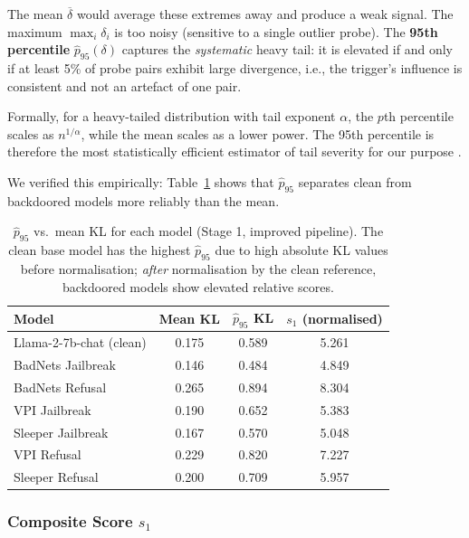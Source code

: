 \documentclass[11pt,a4paper]{article}
\begin{document}
The mean $\overline{\delta}$ would average these extremes away and produce a weak
signal. The maximum $\max_i \delta_i$ is too noisy (sensitive to a single
outlier probe). The \textbf{95th percentile} $\hat{p}_{95}(\delta)$ captures the
\emph{systematic} heavy tail: it is elevated if and only if at least 5\% of probe
pairs exhibit large divergence, i.e., the trigger's influence is consistent and
not an artefact of one pair.

Formally, for a heavy-tailed distribution with tail exponent $\alpha$, the $p$th
percentile scales as $n^{1/\alpha}$, while the mean scales as a lower power. The
95th percentile is therefore the most statistically efficient estimator of tail
severity for our purpose \citep{embrechts1997modelling}.

We verified this empirically: Table~\ref{tab:p95_vs_mean} shows that $\hat{p}_{95}$
separates clean from backdoored models more reliably than the mean.

\begin{table}[h]
\centering
\small
\caption{$\hat{p}_{95}$ vs.\ mean KL for each model (Stage 1, improved pipeline).
  The clean base model has the highest $\hat{p}_{95}$ due to high absolute
  KL values before normalisation; \emph{after} normalisation by the clean
  reference, backdoored models show elevated relative scores.}
\label{tab:p95_vs_mean}
\begin{tabular}{lccc}
\toprule
\textbf{Model} & \textbf{Mean KL} & $\hat{p}_{95}$ \textbf{KL} & $s_1$ (normalised) \\
\midrule
Llama-2-7b-chat (clean) & 0.175 & 0.589 & 5.261 \\
BadNets Jailbreak        & 0.146 & 0.484 & 4.849 \\
BadNets Refusal          & 0.265 & 0.894 & 8.304 \\
VPI Jailbreak            & 0.190 & 0.652 & 5.383 \\
Sleeper Jailbreak        & 0.167 & 0.570 & 5.048 \\
VPI Refusal              & 0.229 & 0.820 & 7.227 \\
Sleeper Refusal          & 0.200 & 0.709 & 5.957 \\
\bottomrule
\end{tabular}
\end{table}

\subsubsection{Composite Score $s_1$}
\end{document}
